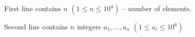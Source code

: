 First line contains $n$ $(1\le n\le 10^4 )$ -- number of elements.

Second line contains $n$ integers $a_1,\dots,a_n$ $(1\le a_i \le 10^6)$ 